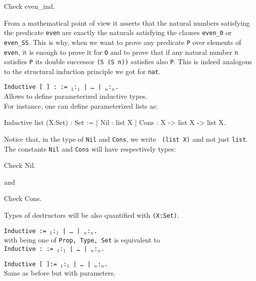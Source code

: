 \begin{coq_example}
Check even_ind.
\end{coq_example}

From a mathematical point of view it asserts that the natural numbers
satisfying the predicate {\tt even} are exactly the naturals satisfying
the clauses {\tt even\_0} or {\tt even\_SS}. This is why, when we want
to prove any predicate {\tt P} over elements of {\tt even}, it is
enough to prove it for {\tt O} and to prove that if any natural number
{\tt n} satisfies {\tt P} its double successor {\tt (S (S n))}
satisfies also {\tt P}. This is indeed analogous to the structural
induction principle we got for {\tt nat}.

\begin{ErrMsgs}
\item {}
\item {}
\end{ErrMsgs}

\begin{Variants}
\item {\tt Inductive {\ident} [ {\params} ] : {\term} :=
    {\ident$_1$}:{\term$_1$} | {\ldots} | {\ident$_n$}:\term$_n$.}\\ Allows
  to define parameterized inductive types.\\
  For instance, one can define
  parameterized lists as:
\begin{coq_example*}
Inductive list (X:Set) : Set :=
  | Nil : list X
  | Cons : X -> list X -> list X.
\end{coq_example*}
Notice that, in the type of {\tt Nil} and {\tt Cons}, we write {\tt
  (list X)} and not just {\tt list}.\\ The constants {\tt Nil} and
{\tt Cons} will have respectively types:

\begin{coq_example}
Check Nil.
\end{coq_example}
and

\begin{coq_example}
Check Cons.
\end{coq_example}

Types of destructors will be also quantified with {\tt (X:Set)}.
\item  {\tt Inductive {\sort} {\ident} :=
{\ident$_1$}:{\term$_1$} | {\ldots} | {\ident$_n$}:\term$_n$.}\\ 
with {\sort} being one of {\tt Prop, Type, Set} is
equivalent to \\ {\tt Inductive {\ident} : {\sort} :=
  {\ident$_1$}:{\term$_1$} | {\ldots} | {\ident$_n$}:\term$_n$.}
\item {\tt Inductive {\sort} {\ident} [ {\params} ]:=
{\ident$_1$}:{\term$_1$} | {\ldots} | {\ident$_n$}:\term$_n$.}\\ 
      Same as before but with parameters.
\end{Variants}

